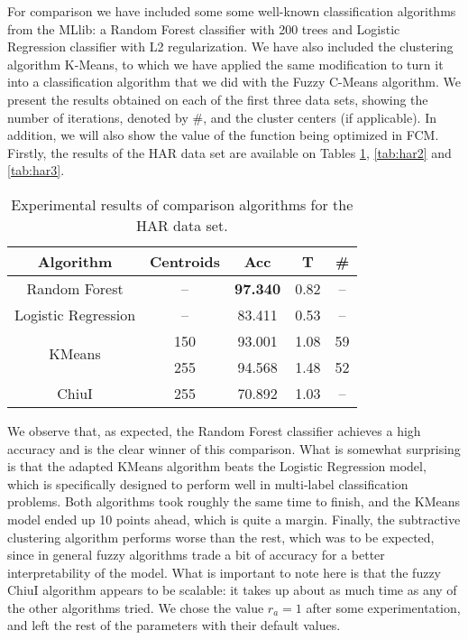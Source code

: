 For comparison we have included some some well-known classification algorithms from the MLlib: a Random Forest classifier with 200 trees and Logistic Regression classifier with L2 regularization. We have also included the clustering algorithm K-Means, to which we have applied the same modification to turn it into a classification algorithm that we did with the Fuzzy C-Means algorithm. We present the results obtained on each of the first three data sets, showing the number of iterations, denoted by \#, and the cluster centers (if applicable). In addition, we will also show the value of the function being optimized in FCM. Firstly, the results of the HAR data set are available on Tables \ref{tab:har1}, \ref{tab:har2} and \ref{tab:har3}.

\begin{table}[h!]
  \centering
\caption{Experimental results of comparison algorithms for the HAR data set.}
\label{tab:har1}
\begin{tabular}{ccccc}
\toprule
Algorithm & Centroids & Acc& T & \# \\ \midrule
Random Forest & -- & \textbf{97.340} & 0.82 & -- \\
Logistic Regression & --& 83.411 & 0.53 & -- \\
\multirow{2}{*}{KMeans} & 150 & 93.001 & 1.08 & 59 \\
& 255 & 94.568 &  1.48 & 52\\
ChiuI & 255 & 70.892 &  1.03 & -- \\ \bottomrule
\end{tabular}
\end{table}

We observe that, as expected, the Random Forest classifier achieves a high accuracy and is the clear winner of this comparison. What is somewhat surprising is that the adapted KMeans algorithm beats the Logistic Regression model, which is specifically designed to perform well in multi-label classification problems. Both algorithms took roughly the same time to finish, and the KMeans model ended up 10 points ahead, which is quite a margin. Finally, the subtractive clustering algorithm performs worse than the rest, which was to be expected, since in general fuzzy algorithms trade a bit of accuracy for a better interpretability of the model. What is important to note here is that the fuzzy ChiuI algorithm appears to be scalable: it takes up about as much time as any of the other algorithms tried. We chose the value $r_a=1$ after some experimentation, and left the rest of the parameters with their default values.

